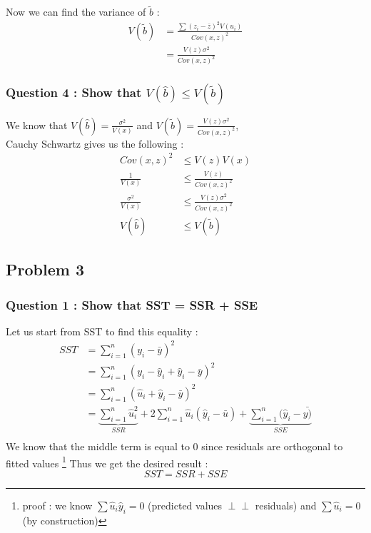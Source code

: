 \documentclass{article}
\newcommand{\ind}{\perp\!\!\!\!\perp}
\begin{document}
Now we can find the variance of $\tilde{b}$ :
\begin{equation}
\begin{aligned}
    V(\tilde{b}) &= \frac{\sum(z_i-\bar{z})^2V(u_i)}{Cov(x,z)^2}\\
    &= \frac{V(z)\sigma^2}{Cov(x,z)^2}
\end{aligned}
\end{equation}

\subsubsection{Question 4 : Show that $V(\hat{b}) \leq V(\tilde{b})$}
We know that $V(\hat{b}) = \frac{\sigma^2}{V(x)}$ and $ V(\tilde{b}) = \frac{V(z)\sigma^2}{Cov(x,z)^2}$,\\
Cauchy Schwartz gives us the following : 
\begin{equation}
\begin{aligned}
    Cov(x,z)^2 &\leq V(z)V(x) \\
    \frac{1}{V(x)} &\leq \frac{V(z)}{Cov(x,z)^2}\\
    \frac{\sigma^2}{V(x)} &\leq \frac{V(z)\sigma^2}{Cov(x,z)^2}\\
    V(\hat{b}) &\leq V(\tilde{b})
\end{aligned}
\end{equation}

\subsection{Problem 3}

\subsubsection{Question 1 : Show that SST = SSR + SSE}
Let us start from SST to find this equality : 
\begin{equation}
\begin{aligned}
    SST &= \sum_{i=1}^n(y_i-\bar{y})^2\\
    &= \sum_{i=1}^n (y_i-\hat{y}_i+\hat{y}_i-\bar{y})^2\\
    &= \sum_{i=1}^n (\hat{u}_i + \hat{y}_i-\bar{y})^2\\
    &= \underbrace{\sum_{i=1}^n\hat{u}_i^2}_{SSR} + 2\sum_{i=1}^n\hat{u}_i(\hat{y}_i-\bar{u}) + \underbrace{\sum_{i=1}^n(\hat{y}_i - \bar{y)}}_{SSE}\\
\end{aligned} 
\end{equation}
We know that the middle term is equal to 0 since residuals are orthogonal to fitted values \footnote[2]{proof : we know $\sum\hat{u}_i\hat{y}_i = 0$ (predicted values $\ind$ residuals) and $\sum\hat{u}_i =0$ (by construction)}
Thus we get the desired result : 
\begin{equation}
        SST = SSR + SSE
\end{equation}
\end{document}
